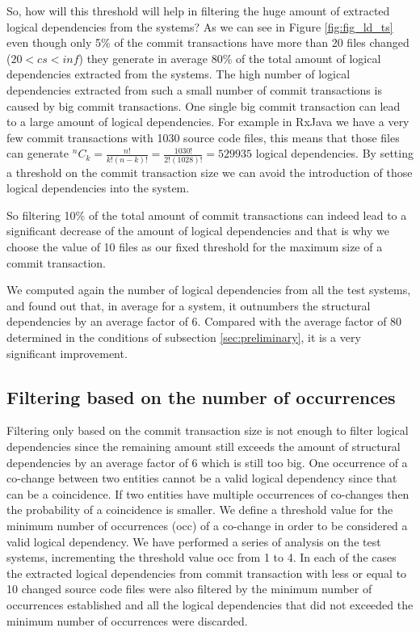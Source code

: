 \documentclass[conference]{IEEEtran}
\newcommand*{\Comb}[2]{{}^{#1}C_{#2}}%
\begin{document}
So, how will this threshold will help in filtering the huge amount of extracted logical dependencies from the systems?
As we can see in Figure \ref{fig:fig_ld_ts} even though only 5\% of the commit transactions have more than 20 files changed ($20<cs<inf$) they generate in average 80\% of the total amount of logical dependencies extracted from the systems.
The high number of logical dependencies extracted from such a small number of commit transactions is caused by big commit transactions. 
One single big commit transaction can lead to a large amount of logical dependencies. For example in RxJava we have a very few commit transactions with 1030 source code files, this means that those files can generate 
$\Comb{n}{k}=\frac{n!}{k!(n-k)!} = \frac{1030!}{2!(1028)!} = 529 935$ logical dependencies. By setting a threshold on the commit transaction size we can avoid the introduction of those logical dependencies into the system.

So filtering 10\% of the total amount of commit transactions can indeed lead to a significant decrease of the amount of logical dependencies and that is why we choose the value of 10 files as our fixed threshold for the maximum size of a commit transaction.

We computed again the number of logical dependencies from all the test systems, and found out that, in average for a system, it outnumbers the structural dependencies by an average factor of 6.  Compared with the average factor of 80 determined in the conditions of subsection \ref{sec:preliminary}, it is a very significant improvement.


\subsection{Filtering based on the number of occurrences}
\label{sec:filterocc}
Filtering only based on the commit transaction size is not enough to filter logical dependencies since the remaining amount still exceeds the amount of structural dependencies by an average factor of 6 which is still too big. 
One occurrence of a co-change between two entities cannot be a valid logical dependency since that can be a coincidence. If two entities have multiple occurrences of co-changes then the probability of a coincidence is smaller. We define a threshold value for the minimum number of occurrences (occ) of a co-change in order to be considered a valid logical dependency.
We have performed a series of analysis on the test systems, incrementing the threshold value occ from 1 to 4. In each of the cases the extracted logical dependencies from commit transaction with less or equal to 10 changed source code files were also filtered by the minimum number of occurrences established and all the logical dependencies that did not exceeded the minimum number of occurrences were discarded. 
\end{document}
